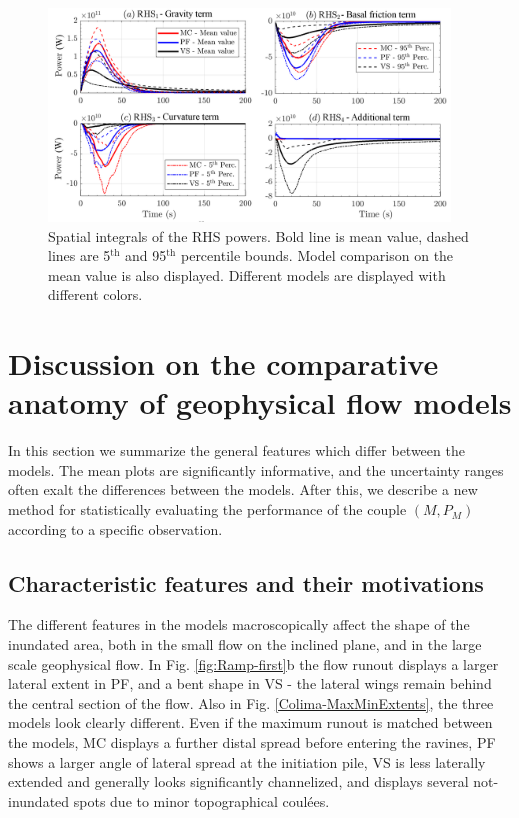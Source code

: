 \documentclass{article}
\begin{document}
\begin{figure}[H]
        \centering
        \includegraphics[width=0.95\textwidth]{BAF_VolcanDeColima/AveragedMeasurments/PowersColima.png}
        \caption{Spatial integrals of the RHS powers. Bold line is mean value, dashed lines are 5$^{\mathrm{th}}$ and 95$^{\mathrm{th}}$ percentile bounds. Model comparison on the mean value is also displayed. Different models are displayed with different colors.}
        \label{fig:Colima-Power-spatial}
\end{figure}
\section{Discussion on the comparative anatomy of geophysical flow models}
In this section we summarize the general features which differ between the models. The mean plots are significantly informative, and the uncertainty ranges often exalt the differences between the models. After this, we describe a new method for statistically evaluating the performance of the couple $\left(M, P_M\right)$ according to a specific observation.

\subsection{Characteristic features and their motivations}
The different features in the models macroscopically affect the shape of the inundated area, both in the small flow on the inclined plane, and in the large scale geophysical flow. In Fig. \ref{fig:Ramp-first}b the flow runout displays a larger lateral extent in PF, and a bent shape in VS - the lateral wings remain behind the central section of the flow. Also in Fig. \ref{Colima-MaxMinExtents}, the three models look clearly different. Even if the maximum runout is matched between the models, MC displays a further distal spread before entering the ravines, PF shows a larger angle of lateral spread at the initiation pile, VS is less laterally extended and generally looks significantly channelized, and displays several not-inundated spots due to minor topographical coul\'{e}es.
\end{document}
